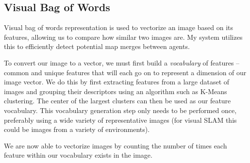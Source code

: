 \subsection{Visual Bag of Words}
\label{sec:visual-bag-of-words}
Visual bag of words representation is used to vectorize an image based on its features, allowing us to compare how similar two images are. My system utilizes this to efficiently detect potential map merges between agents.

To convert our image to a vector, we must first build a \textit{vocabulary} of features – common and unique features that will each go on to represent a dimension of our image vector. We do this by first extracting features from a large dataset of images and grouping their descriptors using an algorithm such as K-Means clustering. The center of the largest clusters can then be used as our feature vocabulary. This vocabulary generation step only needs to be performed once, preferably using a wide variety of representative images (for visual SLAM this could be images from a variety of environments).

We are now able to vectorize images by counting the number of times each feature within our vocabulary exists in the image.

